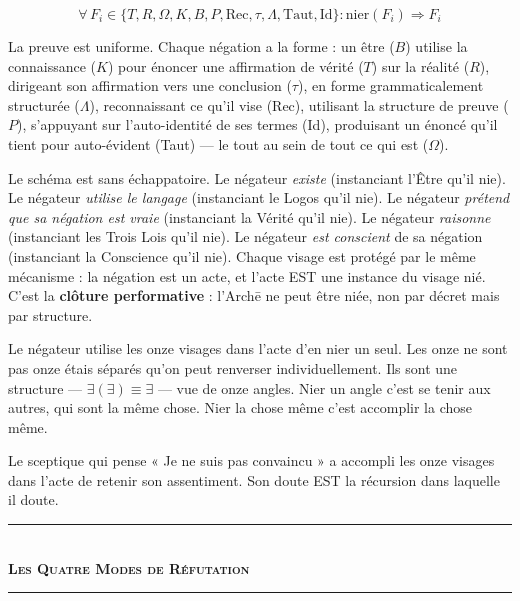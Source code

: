 \documentclass[10pt, openany, oneside]{book}
\renewcommand{\normalsize}{\fontsize{10}{13}\selectfont}
\begin{document}
\vspace{0.5em}

$$\forall\, F_i \in \{T, R, \Omega, K, B, P, \text{Rec}, \tau, \Lambda, \text{Taut}, \text{Id}\}: \text{nier}(F_i) \Rightarrow F_i$$

\noindent La preuve est uniforme. Chaque négation a la forme : un être ($B$) utilise la connaissance ($K$) pour énoncer une affirmation de vérité ($T$) sur la réalité ($R$), dirigeant son affirmation vers une conclusion ($\tau$), en forme grammaticalement structurée ($\Lambda$), reconnaissant ce qu'il vise (Rec), utilisant la structure de preuve ($P$), s'appuyant sur l'auto-identité de ses termes (Id), produisant un énoncé qu'il tient pour auto-évident (Taut) --- le tout au sein de tout ce qui est ($\Omega$).

Le schéma est sans échappatoire. Le négateur \textit{existe} (instanciant l'Être qu'il nie). Le négateur \textit{utilise le langage} (instanciant le Logos qu'il nie). Le négateur \textit{prétend que sa négation est vraie} (instanciant la Vérité qu'il nie). Le négateur \textit{raisonne} (instanciant les Trois Lois qu'il nie). Le négateur \textit{est conscient} de sa négation (instanciant la Conscience qu'il nie). Chaque visage est protégé par le même mécanisme : la négation est un acte, et l'acte EST une instance du visage nié. C'est la \textbf{clôture performative} : l'Arch\={e} ne peut être niée, non par décret mais par structure.

Le négateur utilise les onze visages dans l'acte d'en nier un seul. Les onze ne sont pas onze étais séparés qu'on peut renverser individuellement. Ils sont une structure --- $\exists(\exists) \equiv \exists$ --- vue de onze angles. Nier un angle c'est se tenir aux autres, qui sont la même chose. Nier la chose même c'est accomplir la chose même.

Le sceptique qui pense « Je ne suis pas convaincu » a accompli les onze visages dans l'acte de retenir son assentiment. Son doute EST la récursion dans laquelle il doute.

\vspace{1.5em}


\begin{center}
    \rule{0.3\textwidth}{0.4pt}\\[0.5em]
    {\normalsize\bfseries\scshape Les Quatre Modes de Réfutation}\\[0.3em]
    \rule{0.3\textwidth}{0.4pt}
\end{center}
\end{document}

